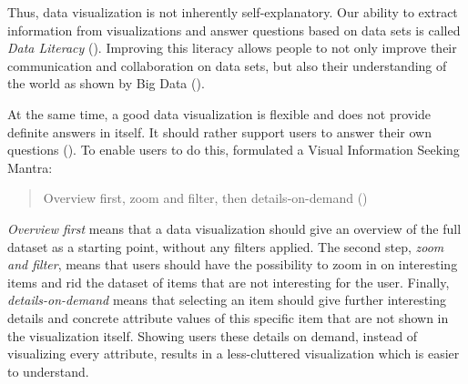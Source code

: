 Thus, data visualization is not inherently self-explanatory. Our ability to extract information from visualizations and answer questions based on data sets is called \emph{Data Literacy} (\cite{boyPrincipledWayAssessing2014}). Improving this literacy allows people to not only improve their communication and collaboration on data sets, but also their understanding of the world as shown by Big Data (\cite{bornerDataVisualizationLiteracy2019}).

At the same time, a good data visualization is flexible and does not provide definite answers in itself. It should rather support users to answer their own questions (\cite{light2001portable}). To enable users to do this, \citeauthor{shneidermanEyesHaveIt1996} formulated a Visual Information Seeking Mantra:

\begin{quote}
    Overview first, zoom and filter, then details-on-demand (\cite[337]{shneidermanEyesHaveIt1996})
\end{quote}

\emph{Overview first} means that a data visualization should give an overview of the full dataset as a starting point, without any filters applied. The second step, \emph{zoom and filter}, means that users should have the possibility to zoom in on interesting items and rid the dataset of items that are not interesting for the user. Finally, \emph{details-on-demand} means that selecting an item should give further interesting details and concrete attribute values of this specific item that are not shown in the visualization itself. Showing users these details on demand, instead of visualizing every attribute, results in a less-cluttered visualization which is easier to understand.

